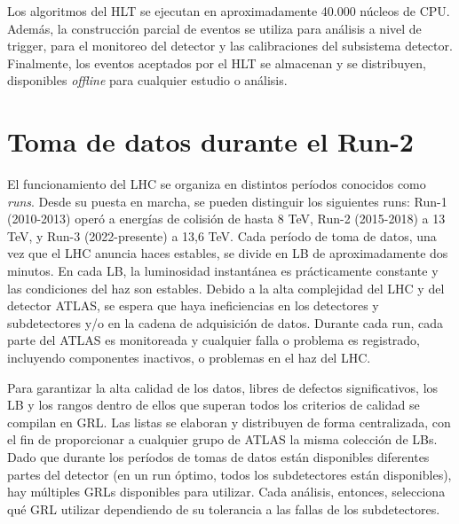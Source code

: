 Los algoritmos del \ac{HLT} se ejecutan en aproximadamente 40.000 núcleos de CPU. Además, la construcción parcial de eventos se utiliza para análisis a nivel de trigger, para el monitoreo del detector y las calibraciones del subsistema detector. Finalmente, los eventos aceptados por el \ac{HLT} se almacenan y se distribuyen, disponibles \textit{offline} para cualquier estudio o análisis.






\FloatBarrier
\section{Toma de datos durante el Run-2}
\label{sec:atlas:runs}


El funcionamiento del \ac{LHC} se organiza en distintos per\'iodos conocidos como \textit{runs}.
Desde su puesta en marcha, se pueden distinguir los siguientes runs: Run-1 (2010-2013) operó a energías de colisión de hasta 8 TeV, Run-2 (2015-2018) a 13 TeV, y Run-3 (2022-presente) a 13,6 TeV. Cada per\'iodo de toma de datos, una vez que el \ac{LHC} anuncia haces estables, se divide en \ac{LB} de aproximadamente dos minutos. En cada \ac{LB}, la luminosidad instantánea es prácticamente constante y las condiciones del haz son estables. Debido a la alta complejidad del \ac{LHC} y del detector \ac{ATLAS}, se espera que haya ineficiencias en los detectores y subdetectores y/o en la cadena de adquisición de datos. Durante cada run, cada parte del \ac{ATLAS} es monitoreada y cualquier falla o problema es registrado, incluyendo componentes inactivos, o problemas en el haz del \ac{LHC}.

Para garantizar la alta calidad de los datos, libres de defectos significativos, los \ac{LB} y los rangos dentro de ellos que superan todos los criterios de calidad se compilan en \ac{GRL}. Las listas se elaboran y distribuyen de forma centralizada, con el fin de proporcionar a cualquier grupo de \ac{ATLAS} la misma colección de \acp{LB}. Dado que durante los per\'iodos de tomas de datos están disponibles diferentes partes del detector (en un run óptimo, todos los subdetectores están disponibles), hay múltiples \acp{GRL} disponibles para utilizar. Cada análisis, entonces, selecciona qué \ac{GRL} utilizar dependiendo de su tolerancia a las fallas de los subdetectores.

